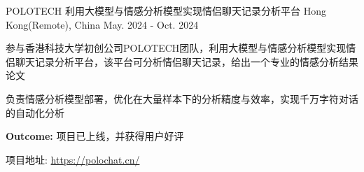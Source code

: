
\newcommand{\expsaddspace}[0]{
  \vspace{5.5mm}
}


\begin{cventries}

  \cventry
  {POLOTECH}
  {利用大模型与情感分析模型实现情侣聊天记录分析平台}
  {Hong Kong(Remote), China}
  {May. 2024 - Oct. 2024}
  {
    \begin{cvitems}
      \item {参与香港科技大学初创公司POLOTECH团队，利用大模型与情感分析模型实现情侣聊天记录分析平台，该平台可分析情侣聊天记录，给出一个专业的情感分析结果论文}
      \item {负责情感分析模型部署，优化在大量样本下的分析精度与效率，实现千万字符对话的自动化分析}
      \item {\textbf{Outcome:} 项目已上线，并获得用户好评}
      \item {项目地址: \href{https://polochat.cn/}{https://polochat.cn/}}
    \end{cvitems}
  }
  \expsaddspace

\end{cventries}
